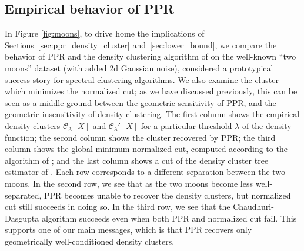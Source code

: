 \documentclass[11pt,twoside]{article}
\newcommand{\1}{\mathbf{1}}
\newcommand{\mc}[1]{\mathcal{#1}}
\begin{document}
\subsection{Empirical behavior of PPR} 
\label{subsec:empirical_behavior_ppr}
In Figure \ref{fig:moons}, to drive home the implications of Sections~\ref{sec:ppr_density_cluster} and~\ref{sec:lower_bound}, we compare the behavior of PPR and the density clustering algorithm of \citet{chaudhuri2010} on the well-known ``two moons'' dataset (with added 2d Gaussian noise), considered a prototypical success story for spectral clustering algorithms. We also examine the cluster which minimizes the normalized cut; as we have discussed previously, this can be seen as a middle ground between the geometric sensitivity of PPR, and the geometric insensitivity of density clustering. The first column shows the empirical density clusters $\mc{C}_{\lambda}[X]$ and $\mc{C}_{\lambda}'[X]$ for a particular threshold $\lambda$ of the density function; the second column shows the cluster recovered by PPR; the third column shows the global minimum normalized cut, computed according to the algorithm of \citet{bresson2013}; and the last column shows a cut of the density cluster tree estimator of \citet{chaudhuri2010}. Each row corresponds to a different separation between the two moons. In the second row, we see that as the two moons become less well-separated, PPR becomes unable to recover the density clusters, but normalized cut still succeeds in doing so. In the third row, we see that the Chaudhuri-Dasgupta algorithm succeeds even when both PPR and normalized cut fail. This supports one of our main messages, which is that PPR recovers only geometrically well-conditioned density clusters.
\end{document}

